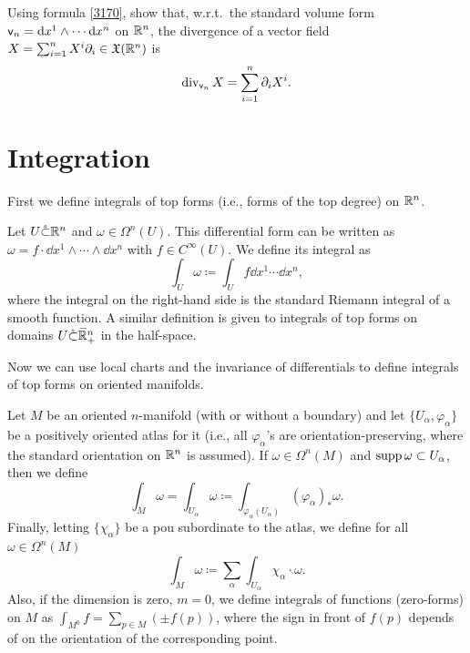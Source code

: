 \begin{xca}
    Using formula \eqref{3170}, show that, w.r.t.\ the standard volume form $\mathsf{v}_n={\mathrm{d}} x^1\wedge \cdots{\mathrm{d}} x^n$ on $\mathbb{R}^n$, the divergence of a vector field $X=\sum_{i=1}^n X^i\partial_i\in\mathfrak{X}(\mathbb{R}^n)$ is 
    \[\operatorname{div}_{\mathsf{v}_n} X=\sum_{i=1}^n \partial_i X^i.\]
\end{xca}









\section{Integration}

First we define integrals of top forms (i.e., forms of the top degree) on $\mathbb{R}^n$.
\begin{defn}
    Let $U\mathring\subset \mathbb{R}^n$ and $\omega\in \Omega^n(U)$. This differential form can be written as $\omega=f\cdot \dd x^1\wedge\cdots\wedge\dd x^n $ with $f\in C^\infty(U)$. We define its integral as
    \[\int_U\omega \coloneqq \int_U f \dd x^1\cdots\dd x^n,\]
    where the integral on the right-hand side is the standard Riemann integral of a smooth function. A similar definition is given to integrals of top forms on domains $U\mathring\subset \wb\bbR^n_+$ in the half-space.
\end{defn}

Now we can use local charts and the invariance of differentials to define integrals of top forms on oriented manifolds.

\begin{defn}
    Let $M$ be an oriented $n$-manifold (with or without a boundary) and let $\{U_\alpha,\varphi_\alpha\}$ be a positively oriented atlas for it (i.e., all $\varphi_\alpha$'s are orientation-preserving, where the standard orientation on $\mathbb{R}^n$ is assumed). If $\omega\in\Omega^n(M)$ and $\operatorname{supp}\omega\subset U_\alpha$, then we define
    \[\int_M \omega= \int_{U_\alpha}\omega \coloneqq \int_{\varphi_\alpha( U_\alpha)}(\varphi_\alpha)_\ast \omega.\]
    Finally, letting $\{\chi_\alpha\}$ be a \gls{pou} subordinate to the atlas, we define for all $\omega\in\Omega^n(M)$
    \[\int_M \omega\coloneqq \sum_\alpha \int_{U_\alpha}\chi_\alpha\cdot\omega.\]
    Also, if the dimension is zero, $m=0$, we define integrals of functions (zero-forms) on $M$ as $\int_{M^0}f=\sum_{p\in M}(\pm f(p))$, where the sign in front of $f(p)$ depends of on the orientation of the corresponding point.
\end{defn}


